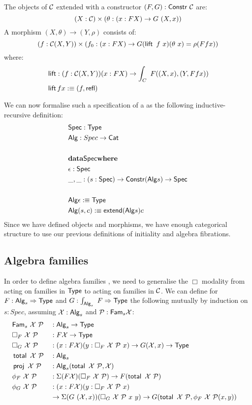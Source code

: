 \documentclass[a4paper,10pt]{article}
\begin{document}
The objects of $\mathcal{C}$ extended with a constructor $(F,G) : \mathsf{Constr}\ \mathcal{C}$ are:
$$
(X : \C) \times (\theta : (x : FX) \to G\ (X,x))
$$
A morphism $(X, \theta) \to (Y, \rho)$ consists of:
$$
(f : \mathcal{C}(X,Y)) \times (f_0 : (x : FX) \to G (\operatorname{\mathsf{lift}}\ f\ x) (\theta\ x) = \rho (F f x))
$$
where:
%
\begin{align*}
&\operatorname{\mathsf{lift}} : (f : \mathcal{C}(X,Y)) (x : FX) \to \int_{C}\ F ((X,x),(Y,Ffx)) \\
&\operatorname{\mathsf{lift}} f x :\equiv (f , \operatorname{\mathsf{refl}})
\end{align*}
%

We can now formalise such a specification of a \hit as the following
inductive-recursive definition:
%
\begin{align*}
  &\mathsf{Spec} : \mathsf{Type} \\
  &\mathsf{Alg} : Spec \to \mathsf{Cat} \\
  \\
  &{\bf data} \mathsf{Spec} {\bf where} \\
  &\epsilon : \mathsf{Spec} \\
  &\_,\_ : (s : \mathsf{Spec}) \to \mathsf{Constr} (\mathsf{Alg} s) \to \mathsf{Spec} \\
  \\
  &\mathsf{Alg} \epsilon :\equiv \mathsf{Type}\\
  &\mathsf{Alg} (s , c) :\equiv \mathsf{extend} (\mathsf{Alg} s) c
\end{align*}
%
Since we have defined objects and morphisms, we have enough
categorical structure to use our previous definitions of initiality
and algebra fibrations. 

\subsection{Algebra families}
\label{sec:algfamhits}
In order to define algebra families , we need to generalise the $\Box$
modality from acting on families in $\mathsf{Type}$ to acting on families in
$\mathcal{C}$. We can define for $F : \mathsf{Alg}_s \Rightarrow \mathsf{Type}$ and
$G : \int_{\mathsf{Alg}_s}\ F \Rightarrow \mathsf{Type}$ the following mutually by induction
on $s : Spec$, assuming $\mathcal{X} : \mathsf{Alg}_s$ and
$\mathcal{P} : \mathsf{Fam}_s \mathcal{X}$:
%
\begin{alignat*}{4}
  &\Fam_s\ \alg{X} \ \algfib{P} &&: \Alg_s \to \Type&\\
  &\Box_F\ \alg{X} \ \algfib{P} &&: F \alg{X} \to \Type&\\
  &\Box_G\ \alg{X} \ \algfib{P} &&: (x : F \alg{X}) (y : \Box_F\ \alg{X} \ \algfib{P}\ x) \to G (\alg{X} , x) \to \Type&\\
  &\total\ \alg{X} \ \algfib{P} &&: \Alg_s&\\
  &\proj\ \alg{X} \ \algfib{P}  &&: \Alg_s(\total\ \alg{X}\ \algfib{P}, \alg{X})&\\
  &\phi_F\ \alg{X} \ \algfib{P} &&: \Sigma (F \alg{X}) (\Box_F\ \alg{X}\ \algfib{P}) \to F (\total\ \alg{X}\ \algfib{P})&\\
  &\phi_G\ \alg{X} \ \algfib{P} &&: (x : F \alg{X}) (y : \Box_F\ \alg{X} \ \algfib{P}\ x) &\\
  &\ \ \ \ &&\to \Sigma (G\ (\alg{X},x)) (\Box_G\ \alg{X}\ \algfib{P}\ x\ y) 
            \to G (\total\ \alg{X}\ \algfib{P}, \phi_F\ \alg{X}\ \algfib{P} (x , y)) &
\end{alignat*}
%
\end{document}

